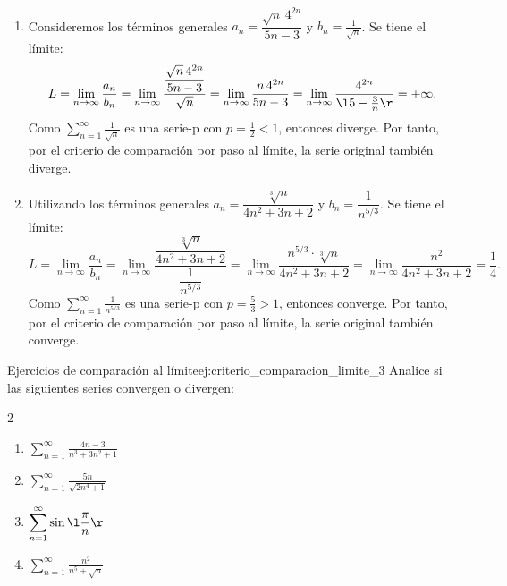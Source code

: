\begin{soln}
    $\left. \right.$
    \begin{enumerate}
        \item Consideremos los términos generales $a_n = \dfrac{\sqrt{n}\, 4^{2n}}{5n-3}$ y $b_n = \frac{1}{\sqrt{n}}$. Se tiene el límite:
        \[ L = \lim_{n \to \infty} \frac{a_n}{b_n} = \lim_{n \to \infty} \frac{\dfrac{\sqrt{n}\, 4^{2n}}{5n-3}}{\sqrt{n}} = \lim_{n \to \infty} \frac{n\, 4^{2n}}{5n-3} = \lim_{n \to \infty} \frac{4^{2n}}{\l 5-\frac{3}{n} \r} = +\infty. \]
        Como $\displaystyle \sum_{n=1}^{\infty} \frac{1}{\sqrt{n}}$ es una serie-p con $p = \frac{1}{2} < 1$, entonces diverge. Por tanto, por el criterio de comparación por paso al límite, la serie original también diverge.
        
        \item Utilizando los términos generales $a_n = \dfrac{\sqrt[3]{n}}{4n^2 +3n+2}$ y $b_n = \dfrac{1}{n^{5/3}}$. Se tiene el límite:
        \[ L = \lim_{n \to \infty} \frac{a_n}{b_n} = \lim_{n \to \infty} \frac{\dfrac{\sqrt[3]{n}}{4n^2 +3n+2}}{\dfrac{1}{n^{5/3}}} = \lim_{n \to \infty} \frac{n^{5/3} \cdot \sqrt[3]{n}}{4n^2 +3n+2} = \lim_{n \to \infty} \frac{n^2}{4n^2 +3n+2} = \frac{1}{4}. \]
        Como $\displaystyle \sum_{n=1}^{\infty} \frac{1}{n^{5/3}}$ es una serie-p con $p = \frac{5}{3} > 1$, entonces converge. Por tanto, por el criterio de comparación por paso al límite, la serie original también converge.
    \end{enumerate}
\end{soln}

\begin{problem}{Ejercicios de comparación al límite}{ej:criterio_comparacion_limite_3}
    Analice si las siguientes series convergen o divergen:
    \begin{multicols}{2}
        \begin{enumerate}
            \item $\displaystyle\sum_{n=1}^{\infty}\frac{4n-3}{n^3+3n^2+1}$
            \item $\displaystyle\sum_{n=1}^{\infty}\frac{5n}{\sqrt{2n^4+1}}$
            \item $\displaystyle\sum_{n=1}^{\infty}\sin{\l \dfrac{\pi}{n} \r}$
            \item $\displaystyle\sum_{n=1}^{\infty}\frac{n^2}{n^5 +\sqrt{n}}$
        \end{enumerate}
    \end{multicols}
\end{problem}

